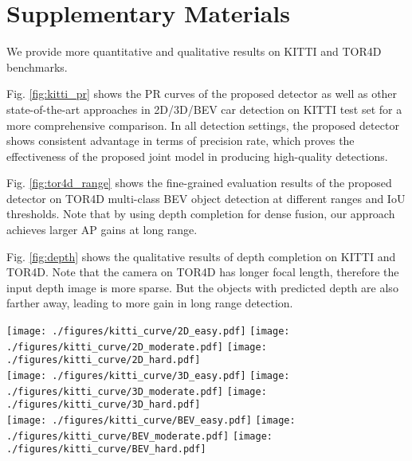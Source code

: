 \documentclass[10pt,twocolumn,letterpaper]{article}
\begin{document}
{\small


}

\section*{Supplementary Materials}
We provide more quantitative and qualitative results on KITTI \cite{kitti} and TOR4D \cite{pixor} benchmarks.

Fig. \ref{fig:kitti_pr} shows the PR curves of the proposed detector as well as other state-of-the-art approaches in 2D/3D/BEV car detection on KITTI test set for a more comprehensive comparison. In all detection settings, the proposed detector shows consistent advantage in terms of precision rate, which proves the effectiveness of the proposed joint model in producing high-quality detections.

Fig. \ref{fig:tor4d_range} shows the fine-grained evaluation results of the proposed detector on TOR4D multi-class BEV object detection at different ranges and IoU thresholds. Note that by using depth completion for dense fusion, our approach achieves larger AP gains at long range.

Fig. \ref{fig:depth} shows the qualitative results of depth completion on KITTI and TOR4D. Note that the camera on TOR4D has longer focal length, therefore the input depth image is more sparse. But the objects with predicted depth are also farther away, leading to more gain in long range detection.

\begin{figure*}[t]
\begin{center}
\texttt{[image: ./figures/kitti\_curve/2D\_easy.pdf]} \texttt{[image: ./figures/kitti\_curve/2D\_moderate.pdf]} \texttt{[image: ./figures/kitti\_curve/2D\_hard.pdf]}\\
\texttt{[image: ./figures/kitti\_curve/3D\_easy.pdf]} \texttt{[image: ./figures/kitti\_curve/3D\_moderate.pdf]} \texttt{[image: ./figures/kitti\_curve/3D\_hard.pdf]}\\
\texttt{[image: ./figures/kitti\_curve/BEV\_easy.pdf]} \texttt{[image: ./figures/kitti\_curve/BEV\_moderate.pdf]} \texttt{[image: ./figures/kitti\_curve/BEV\_hard.pdf]}
\end{center}
   \caption{PR curve comparison between the proposed \textbf{MMF} and other state-of-the-art in 2D/3D/BEV car detection on KITTI testing set.}
\label{fig:kitti_pr}
\end{figure*}
\end{document}
